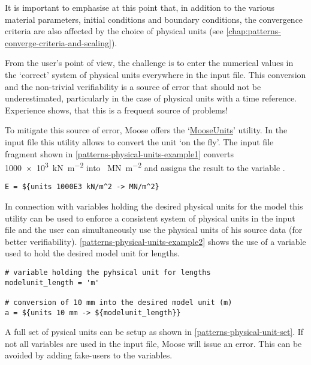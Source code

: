 It is important to emphasise at this point that, in addition to the various
material parameters, initial conditions and boundary conditions, the
convergence criteria are also affected by the choice of physical units (see
\autoref{chap:patterns-converge-criteria-and-scaling}).

From the user's point of view, the challenge is to enter the numerical values
in the ‘correct’ system of physical units everywhere in the input file. This
conversion and the non-trivial verifiability is a source of error that should
not be underestimated, particularly in the case of physical units with a time
reference. Experience shows, that this is a frequent source of problems!

To mitigate this source of error, Moose offers the
‘\href{https://mooseframework.inl.gov/source/utils/Units.html}{MooseUnits}’
utility. In the input file this utility allows to convert the unit ‘on the
fly’. The input file fragment shown in
\autoref{patterns-physical-units-example1} converts \SI{1000e3}{\kN\per\m^2}
into \SI{}{\MN\per\m^2} and assigns the result to the variable .

\begin{lstlisting}[language=Moose, caption={Converting \SI{1000e3}{\kN\per\m^2} into
    \SI{}{\MN\per\m^2}},label={patterns-physical-units-example1}]
E = ${units 1000E3 kN/m^2 -> MN/m^2}
\end{lstlisting}

In connection with variables holding the desired physical units for the model
this utility can be used to enforce a consistent system of physical units in
the input file and the user can simultaneously use the physical units of his
source data (for better verifiability).
\autoref{patterns-physical-units-example2} shows the use of a variable used to
hold the desired model unit for lengths.

\begin{lstlisting}[language=Moose, caption={Using a variable to hold the physical unit for lengths},label={patterns-physical-units-example2}]
# variable holding the pyhsical unit for lengths
modelunit_length = 'm'

# conversion of 10 mm into the desired model unit (m)
a = ${units 10 mm -> ${modelunit_length}}
\end{lstlisting}

A full set of pysical units can be setup as shown in
\autoref{patterns-physical-unit-set}. If not all variables are used in the
input file, Moose will issue an error. This can be avoided by adding fake-users
to the variables.


